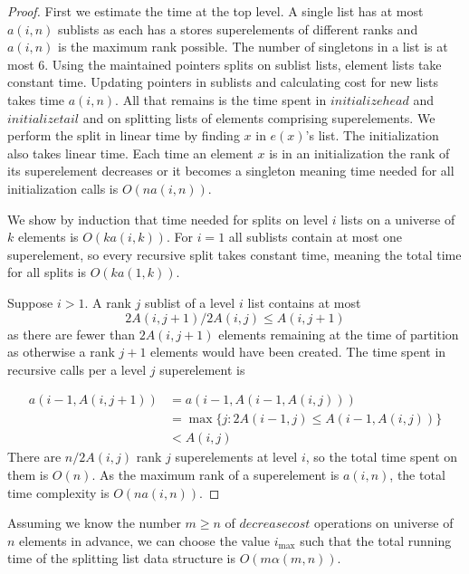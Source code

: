 \begin{proof}
    First we estimate the time at the top level. A single list has at most $a(i,n)$ sublists as each has a stores superelements of different ranks and $a(i,n)$ is the maximum rank possible. The number of singletons in a list is at most $6$. Using the maintained pointers splits on sublist lists, element lists take constant time. Updating pointers in sublists and calculating cost for new lists takes time $a(i,n)$. All that remains is the time spent in $initializehead$ and $initializetail$ and on splitting lists of elements comprising superelements. We perform the split in linear time by finding $x$ in $e(x)$'s list. The initialization also takes linear time. Each time an element $x$ is in an initialization the rank of its superelement decreases or it becomes a singleton meaning time needed for all initialization calls is $O(na(i,n))$.

    We show by induction that time needed for splits on level $i$ lists on a universe of $k$ elements is $O(ka(i,k))$. For $i=1$ all sublists contain at most one superelement, so every recursive split takes constant time, meaning the total time for all splits is $O(ka(1,k))$.

    Suppose $i > 1$. A rank $j$ sublist of a level $i$ list contains at most 
    \[2A(i,j+1) / 2A(i,j) \leq A(i,j+1)\]
    as there are fewer than $2A(i,j+1)$ elements remaining at the time of partition as otherwise a rank $j+1$ elements would have been created. The time spent in recursive calls per a level $j$ superelement is

    \begin{align*}
        a(i-1,A(i,j+1)) &= a(i-1, A(i-1,A(i,j))) \\
        &= \max \{ j: 2A(i-1,j) \leq A(i-1,A(i,j)) \} \\
        &< A(i,j) 
    \end{align*}
    There are $n / 2A(i,j)$ rank $j$ superelements at level $i$, so the total time spent on them is $O(n)$. As the maximum rank of a superelement is $a(i,n)$, the total time complexity is $O(na(i,n))$.

\end{proof}

\begin{theorem}\label{thm:sfm_time}
    Assuming we know the number $m \geq n$ of $decreasecost$ operations on universe of $n$ elements in advance, we can choose the value $i_{\max}$ such that the total running time of the splitting list data structure is $O(m\alpha(m,n))$.
\end{theorem}

